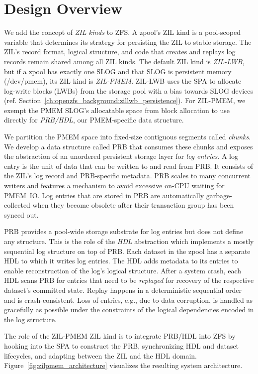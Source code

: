 \documentclass[12pt,a4paper,twoside]{book}
\begin{document}
\section{Design Overview}\label{sec:designoverview}
We add the concept of \textit{ZIL kinds} to ZFS.
A zpool's ZIL kind is a pool-scoped variable that determines its strategy for persisting the ZIL to stable storage.
The ZIL's record format, logical structure, and code that creates and replays log records remain shared among all ZIL kinds.
The default ZIL kind is \textit{ZIL-LWB}, but if a zpool has exactly one SLOG and that SLOG is persistent memory (/dev/pmem), its ZIL kind is \textit{ZIL-PMEM}.
ZIL-LWB uses the SPA to allocate log-write blocks (LWBs) from the storage pool with a bias towards SLOG devices (ref. Section~\ref{ch:openzfs_background:zillwb_persistence}).
For ZIL-PMEM, we exempt the PMEM SLOG's allocatable space from block allocation to use directly for \textit{PRB/HDL}, our PMEM-specific data structure.

We partition the PMEM space into fixed-size contiguous segments called \textit{chunks}.
We develop a data structure called PRB that consumes these chunks and exposes the abstraction of an unordered persistent storage layer for \textit{log entries}.
A log entry is the unit of data that can be written to and read from PRB.
It consists of the ZIL's log record and PRB-specific metadata.
PRB scales to many concurrent writers and features a mechanism to avoid excessive on-CPU waiting for PMEM~IO.
Log entries that are stored in PRB are automatically garbage-collected when they become obsolete after their transaction group has been synced out.

PRB provides a pool-wide storage substrate for log entries but does not define any structure.
This is the role of the \textit{HDL} abstraction which implements a mostly sequential log structure on top of PRB.
Each dataset in the zpool has a separate HDL to which it writes log entries.
The HDL adds metadata to its entries to enable reconstruction of the log's logical structure.
After a system crash, each HDL scans PRB for entries that need to be \textit{replayed} for recovery of the respective dataset's committed state.
Replay happens in a deterministic sequential order and is crash-consistent.
Loss of entries, e.g., due to data corruption, is handled as gracefully as possible under the constraints of the logical dependencies encoded in the log structure.

The role of the ZIL-PMEM ZIL kind is to integrate PRB/HDL into ZFS by
hooking into the SPA to construct the PRB,
synchronizing HDL and dataset lifecycles, and
adapting between the ZIL and the HDL domain.
Figure~\ref{fig:zilpmem_architecture} visualizes the resulting system architecture.
\end{document}
